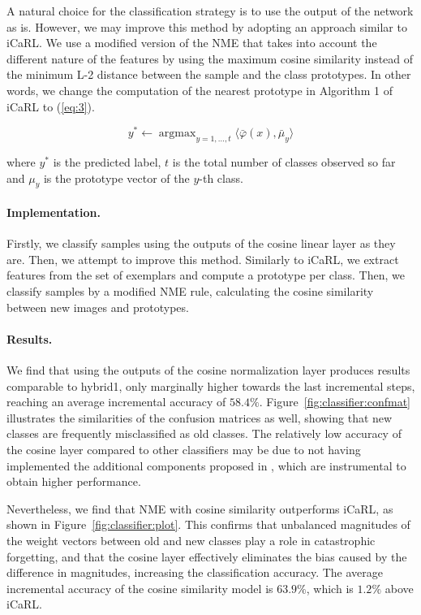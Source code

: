 \documentclass[10pt,twocolumn,letterpaper]{article}
\DeclareMathOperator*{\argmax}{argmax}
\begin{document}
A natural choice for the classification strategy is to use the output of the network as is. However, we may improve this method by adopting an approach similar to iCaRL. We use a modified version of the NME that takes into account the different nature of the features by using the maximum cosine similarity instead of the minimum L-2 distance between the sample and the class prototypes. In other words, we change the computation of the nearest prototype in Algorithm 1 of iCaRL to (\ref{eq:3}).

\begin{equation}
    y^{*} \gets \argmax_{y=1, \dots, t} \langle \bar{\varphi}(x), \bar{\mu}_{y} \rangle \label{eq:3}
\end{equation}

where $y^{*}$ is the predicted label, $t$ is the total number of classes observed so far and $\mu_{y}$ is the prototype vector of the $y$-th class.

\paragraph{Implementation.} Firstly, we classify samples using the outputs of the cosine linear layer as they are. Then, we attempt to improve this method. Similarly to iCaRL, we extract features from the set of exemplars and compute a prototype per class. Then, we classify samples by a modified NME rule, calculating the cosine similarity between new images and prototypes.

\paragraph{Results.} We find that using the outputs of the cosine normalization layer produces results comparable to hybrid1, only marginally higher towards the last incremental steps, reaching an average incremental accuracy of $58.4\%$. Figure~\ref{fig:classifier:confmat} illustrates the similarities of the confusion matrices as well, showing that new classes are frequently misclassified as old classes. The relatively low accuracy of the cosine layer compared to other classifiers may be due to not having implemented the additional components proposed in \cite{hou:2019}, which are instrumental to obtain higher performance.

Nevertheless, we find that NME with cosine similarity outperforms iCaRL, as shown in Figure~\ref{fig:classifier:plot}. This confirms that unbalanced magnitudes of the weight vectors between old and new classes play a role in catastrophic forgetting, and that the cosine layer effectively eliminates the bias caused by the difference in magnitudes, increasing the classification accuracy. The average incremental accuracy of the cosine similarity model is $63.9\%$, which is $1.2\%$ above iCaRL.
\end{document}
